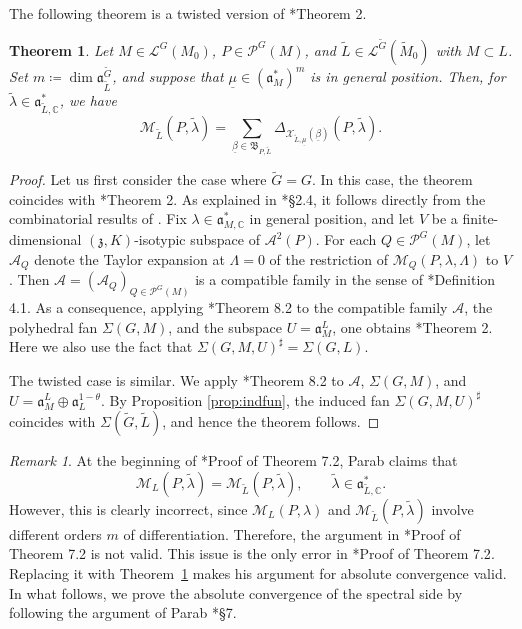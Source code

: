 \documentclass[12pt]{amsart}
\theoremstyle{definition}
\theoremstyle{plain}
\newtheorem{theorem}[definition]{Theorem}
\theoremstyle{remark}
\newtheorem{remark}[definition]{Remark}
\def\C{\mathbb{C}}%
\newcommand{\fa}{\mathfrak{a}}
\newcommand{\fz}{\mathfrak{z}}
\newcommand{\fB}{\mathfrak{B}}
\newcommand{\cA}{\mathcal{A}}
\newcommand{\cL}{\mathcal{L}}
\newcommand{\cM}{\mathcal{M}}
\newcommand{\cP}{\mathcal{P}}
\newcommand{\cX}{\mathcal{X}}
\numberwithin{equation}{section}
\newcommand{\tG}{\widetilde{G}}
\newcommand{\tM}{\widetilde{M}}
\newcommand{\tL}{\widetilde{L}}
\newcommand{\tlambda}{\widetilde{\lambda}}
\begin{document}
The following theorem is a twisted version of \cite{FLM11}*{Theorem 2}.
\begin{theorem}\label{thm:main}
Let $M\in\cL^G(M_0)$, $P\in\cP^G(M)$, and $\tL\in\cL^{\tG}(\tM_0)$ with $M\subset L$. 
Set $m\coloneqq \dim \fa_{\tL}^{\tG}$, and suppose that $\underline{\mu}\in(\fa_M^*)^m$ is in general position. 
Then, for $\tlambda\in\fa^*_{\tL,\C}$, we have
\begin{equation*}\label{eq:FLMmain-}
\cM_{\tL}(P,\tlambda)
=
\sum_{\underline{\beta}\in \fB_{P,\tL}}
\Delta_{\cX_{\tL,\underline{\mu}}(\underline{\beta})}(P,\tlambda).
\end{equation*}
\end{theorem}
\begin{proof}
Let us first consider the case where $\tG=G$.
In this case, the theorem coincides with \cite{FLM11}*{Theorem 2}. 
As explained in \cite{FLM11}*{\S2.4}, it follows directly from the combinatorial results of \cite{FL11}.
Fix $\lambda\in\fa^*_{M,\C}$ in general position, and let $V$ be a finite-dimensional $(\fz,K)$-isotypic subspace of $\cA^2(P)$.
For each $Q\in\cP^G(M)$, let $\cA_Q$ denote the Taylor expansion at $\Lambda=0$ of the restriction of $\cM_Q(P,\lambda,\Lambda)$ to $V$.
Then $\cA=(\cA_Q)_{Q\in \cP^G(M)}$ is a compatible family in the sense of \cite{FL11}*{Definition 4.1}.
As a consequence, applying \cite{FL11}*{Theorem 8.2} to the compatible family $\cA$, the polyhedral fan $\Sigma(G,M)$, and the subspace $U=\fa_M^L$, one obtains \cite{FLM11}*{Theorem 2}.
Here we also use the fact that $\Sigma(G,M,U)^\sharp=\Sigma(G,L)$.

The twisted case is similar. 
We apply \cite{FL11}*{Theorem 8.2} to $\cA$, $\Sigma(G,M)$, and $U=\fa_M^L\oplus\fa_L^{1-\theta}$. 
By Proposition \ref{prop:indfun}, the induced fan $\Sigma(G,M,U)^\sharp$ coincides with $\Sigma(\tG,\tL)$, and hence the theorem follows.
\end{proof}

\begin{remark}\label{rem:Parab}
    At the beginning of \cite{Par19}*{Proof of Theorem 7.2}, Parab claims that
    \[
    \cM_L(P,\tlambda)=\cM_{\tL}(P,\tlambda) , \qquad  \tlambda\in \fa_{\tL,\C}^*.
    \]
    However, this is clearly incorrect, since $\cM_L(P,\lambda)$ and $\cM_{\tL}(P,\tlambda)$ involve different orders $m$ of differentiation.
    Therefore, the argument in \cite{Par19}*{Proof of Theorem 7.2} is not valid. 
    This issue is the only error in \cite{Par19}*{Proof of Theorem 7.2}. Replacing it with Theorem~\ref{thm:main} makes his argument for absolute convergence valid.
    In what follows, we prove the absolute convergence of the spectral side by following the argument of Parab \cite{Par19}*{\S7}.    
\end{remark}
\end{document}
